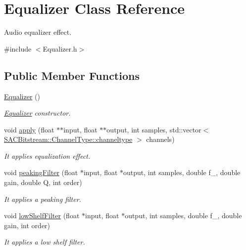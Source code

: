 \hypertarget{class_equalizer}{}\section{Equalizer Class Reference}
\label{class_equalizer}


Audio equalizer effect.  




{\ttfamily \#include $<$Equalizer.\+h$>$}

\subsection*{Public Member Functions}
\begin{DoxyCompactItemize}
\item 
\mbox{\label{class_equalizer_a0bde3f0da43020c61665e1b6fd4b5854}} 
\hyperlink{class_equalizer_a0bde3f0da43020c61665e1b6fd4b5854}{Equalizer} ()
\begin{DoxyCompactList}\small\item\em \hyperlink{class_equalizer}{Equalizer} constructor. \end{DoxyCompactList}\item 
void \hyperlink{class_equalizer_ab58427efe27cc81be35410453a4158d6}{apply} (float $\ast$$\ast$input, float $\ast$$\ast$output, int samples, std\+::vector$<$ \hyperlink{struct_s_a_c_bitstream_1_1_channel_type_a31c32b34085c06a1c58d920ca28c17c9}{S\+A\+C\+Bitstream\+::\+Channel\+Type\+::channeltype} $>$ channels)
\begin{DoxyCompactList}\small\item\em It applies equalization effect. \end{DoxyCompactList}\item 
void \hyperlink{class_equalizer_af30b0db022898105af9bee40d374fcde}{peaking\+Filter} (float $\ast$input, float $\ast$output, int samples, double f\+\_, double gain, double Q, int order)
\begin{DoxyCompactList}\small\item\em It applies a peaking filter. \end{DoxyCompactList}\item 
void \hyperlink{class_equalizer_a45f228e5ba216af9214f9a0070d2199e}{low\+Shelf\+Filter} (float $\ast$input, float $\ast$output, int samples, double f\+\_, double gain, int order)
\begin{DoxyCompactList}\small\item\em It applies a low shelf filter. \end{DoxyCompactList}\item 

\end{DoxyCompactItemize}
